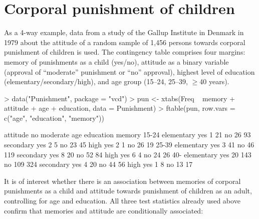 \documentclass{Z}
\begin{document}
\section{Corporal punishment of children}

As a 4-way example, data from a study of the Gallup Institute in Denmark in 1979 about
the attitude of a random sample of 1,456 persons towards corporal
punishment of children is used. The contingency table comprises four margins:
memory of punishments as a child (yes/no), attitude as a binary variable
(approval of ``moderate'' punishment or ``no'' approval), highest level
of education (elementary/secondary/high), and age group (15--24, 25--39, $\ge$40 years).

\begin{Schunk}
\begin{Sinput}
> data("Punishment", package = "vcd")
> pun <- xtabs(Freq ~ memory + attitude + age + education, data = Punishment)
> ftable(pun, row.vars = c("age", "education", "memory"))
\end{Sinput}
\begin{Soutput}
                        attitude  no moderate
age   education  memory                      
15-24 elementary yes               1       21
                 no               26       93
      secondary  yes               2        5
                 no               23       45
      high       yes               2        1
                 no               26       19
25-39 elementary yes               3       41
                 no               46      119
      secondary  yes               8       20
                 no               52       84
      high       yes               6        4
                 no               24       26
40-   elementary yes              20      143
                 no              109      324
      secondary  yes               4       20
                 no               44       56
      high       yes               1        8
                 no               13       17
\end{Soutput}
\end{Schunk}

It is of interest whether there is an association between memories of corporal punishments
as a child and attitude towards punishment of children as an adult, controlling
for age and education. All three test statistics already used above confirm that 
memories and attitude are conditionally associated:
\end{document}
